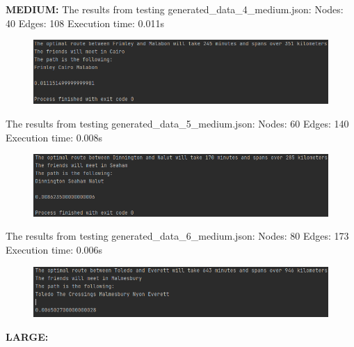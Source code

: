 \documentclass[12pt]{article}
\begin{document}
\newline
\newline
\textbf{MEDIUM:}
\newline
The results from testing generated\_data\_4\_medium.json:
\newline
Nodes: 40
\newline
Edges: 108
\newline
Execution time: 0.011s
\begin{figure}[htp]
    \centering
    \includegraphics[width=1\textwidth]{medium1.png}
\end{figure}
\newline
The results from testing generated\_data\_5\_medium.json:
\newline
Nodes: 60
\newline
Edges: 140
\newline
Execution time: 0.008s
\begin{figure}[htp]
    \centering
    \includegraphics[width=1\textwidth]{medium2.png}
\end{figure}
\newpage
\newline
The results from testing generated\_data\_6\_medium.json:
\newline
Nodes: 80
\newline
Edges: 173
\newline
Execution time: 0.006s
\begin{figure}[htp]
    \centering
    \includegraphics[width=1\textwidth]{medium3.png}
\end{figure}
\newline
\newline
\textbf{LARGE:}
\newline
\end{document}
